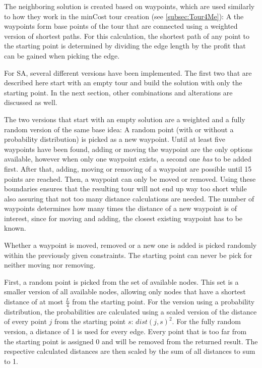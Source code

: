 The neighboring solution is created based on waypoints, which are used similarly to how they work in the minCost tour creation (see \ref{subsec:Tour4Me}):
A the waypoints form base points of the tour that are connected using a weighted version of shortest paths. 
For this calculation, the shortest path of any point to the starting point is determined by dividing the edge length by the profit that can be gained when picking the edge. 

For SA, several different versions have been implemented.
The first two that are described here start with an empty tour and build the solution with only the starting point.
In the next section, other combinations and alterations are discussed as well.

The two versions that start with an empty solution are a weighted and a fully random version of the same base idea:
A random point (with or without a probability distribution) is picked as a new waypoint. 
Until at least five waypoints have been found, adding or moving the waypoint are the only options available, however when only one waypoint exists, a second one \textit{has} to be added first.
After that, adding, moving or removing of a waypoint are possible until 15 points are reached.
Then, a waypoint can only be moved or removed.
Using these boundaries ensures that the resulting tour will not end up way too short while also assuring that not too many distance calculations are needed.
The number of waypoints determines how many times the distance of a new waypoint is of interest, since for moving and adding, the closest existing waypoint has to be known.


Whether a waypoint is moved, removed or a new one is added is picked randomly within the previously given constraints.
The starting point can never be pick for neither moving nor removing.

First, a random point is picked from the set of available nodes.
This set is a smaller version of all available nodes, allowing only nodes that have a shortest distance of at most $\frac{L}{4}$ from the starting point. 
For the version using a probability distribution, the probabilities are calculated using a scaled version of the distance of every point $j$ from the starting point $s$: $dist(j,s)^2$.
For the fully random version, a distance of 1 is used for every edge.
Every point that is too far from the starting point is assigned 0 and will be removed from the returned result.
The respective calculated distances are then scaled by the sum of all distances to sum to 1.

